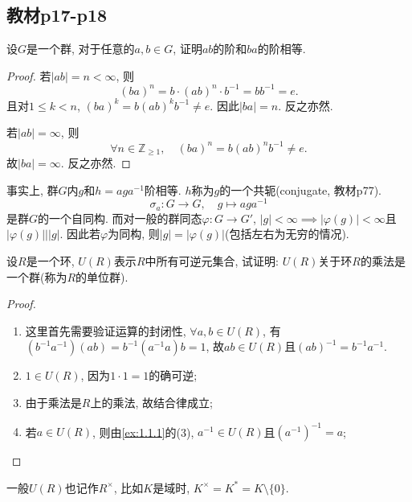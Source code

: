 \subsection{教材p17-p18}

\begin{problem}\label{ex:1.3.1}
    设$G$是一个群, 对于任意的$a, b \in G$, 证明$ab$的阶和$ba$的阶相等.
\end{problem}

\begin{proof}
    若$|ab| = n < \infty$, 则
    \[
        (ba)^n = b \cdot (ab)^n \cdot b^{-1} = bb^{-1} = e.
    \]
    且对$1 \leqslant k < n$, $(ba)^k = b(ab)^kb^{-1} \neq e$. 因此$|ba| = n$. 反之亦然.
    
    若$|ab| = \infty$, 则
    \[
        \forall n \in \mathbb{Z}_{\geqslant 1}, \quad (ba)^n = b(ab)^nb^{-1} \neq e.
    \]
    故$|ba| = \infty$. 反之亦然.
\end{proof}

\begin{remark}
    事实上, 群$G$内$g$和$h = aga^{-1}$阶相等. $h$称为$g$的一个共轭(conjugate, 教材p77).
    \[
        \sigma_a: G \to G, \quad g \mapsto aga^{-1}
    \]
    是群$G$的一个自同构. 而对一般的群同态$\varphi: G \to G'$, $|g| < \infty \implies |\varphi(g)| < \infty$且$|\varphi(g)| \big| |g|$. 因此若$\varphi$为同构, 则$|g| = |\varphi(g)|$(包括左右为无穷的情况).
\end{remark}

\begin{problem}\label{ex:1.3.2}
    设$R$是一个环, $U(R)$表示$R$中所有可逆元集合, 试证明: $U(R)$关于环$R$的乘法是一个群(称为$R$的单位群).
\end{problem}

\begin{proof}
    \begin{enumerate}[(1)]
        \item 这里首先需要验证运算的封闭性, $\forall a, b \in U(R)$, 有$(b^{-1}a^{-1})(ab) = b^{-1}(a^{-1}a)b = 1$, 故$ab \in U(R)$且$(ab)^{-1} = b^{-1}a^{-1}$.
        \item $1 \in U(R)$, 因为$1 \cdot 1 = 1$的确可逆;
        \item 由于乘法是$R$上的乘法, 故结合律成立;
        \item 若$a \in U(R)$, 则由\ref{ex:1.1.1}的(3), $a^{-1} \in U(R)$且$(a^{-1})^{-1} = a$;
    \end{enumerate}
\end{proof}

\begin{remark}
    一般$U(R)$也记作$R^\times$, 比如$K$是域时, $K^\times = K^* =  K \setminus \{0\}$.
\end{remark}

